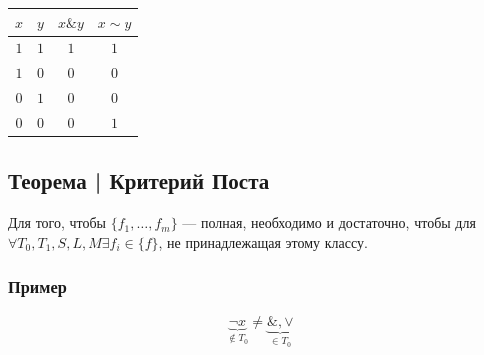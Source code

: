 \documentclass{article}
\begin{document}
\begin{tabular}{c|c|c|c}
    $x$ & $y$ & $x \& y$ & $x \sim y$ \\
    \hline
    $1$ & $1$ & $1$      & $1$        \\
    $1$ & $0$ & $0$      & $0$        \\
    $0$ & $1$ & $0$      & $0$        \\
    $0$ & $0$ & $0$      & $1$ 
\end{tabular}


\subsection{Теорема | Критерий Поста}
Для того, чтобы $\{f_1, \dots, f_m\}$ --- полная, необходимо и достаточно, 
чтобы для $\forall T_0, T_1, S, L, M \exists f_i \in \{f\}$, не принадлежащая этому классу.

\subsubsection{Пример}
\[
    \underbrace{\neg x}_{\notin T_0} \neq \underbrace{\&, \vee}_{\in T_0}
\]
\end{document}
